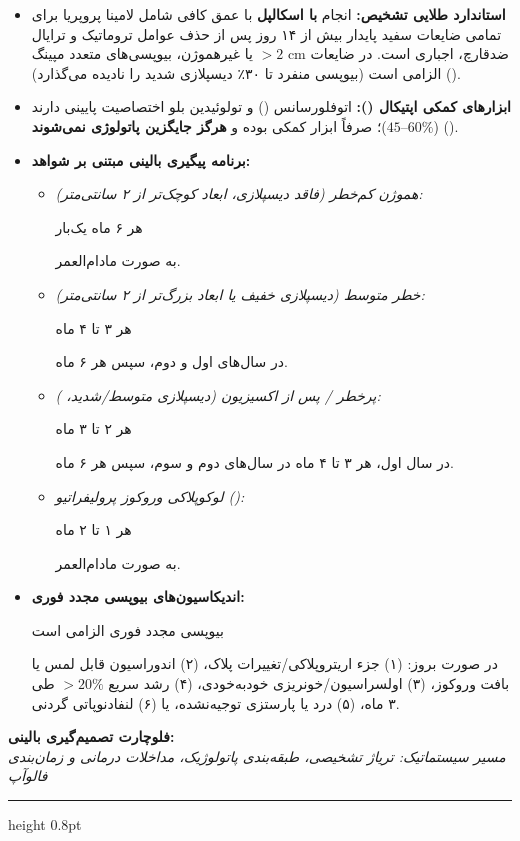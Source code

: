 \documentclass[a4paper]{article}
\newcommand{\hlg}[1]{\colorbox{hlgray}{\strut #1}}
\newcommand{\hly}[1]{\colorbox{hlyellow}{\strut #1}}
\newcommand{\hlr}[1]{\colorbox{hlred}{\strut\color{darkred}#1}}
\begin{document}
\begin{itemize}
    \item \textbf{استاندارد طلایی تشخیص:} انجام \textbf{ با اسکالپل} با عمق کافی شامل لامینا پروپریا برای تمامی ضایعات سفید پایدار بیش از ۱۴ روز پس از حذف عوامل تروماتیک و ترایال ضدقارچ، اجباری است. در ضایعات $>2\text{ cm}$ یا غیرهموژن، بیوپسی‌های متعدد مپینگ () الزامی است (بیوپسی منفرد تا ۳۰٪ دیسپلازی شدید را نادیده می‌گذارد).
    \item \textbf{ابزارهای کمکی اپتیکال ():} اتوفلورسانس () و تولوئیدین بلو اختصاصیت پایینی دارند ($45\text{--}60\%$)؛ صرفاً ابزار کمکی بوده و \textbf{هرگز جایگزین پاتولوژی نمی‌شوند} ().
    \item \textbf{برنامه پیگیری بالینی مبتنی بر شواهد:}
    \begin{itemize}
        \item \textit{هموژن کم‌خطر (فاقد دیسپلازی، ابعاد کوچک‌تر از ۲ سانتی‌متر):} \hlg{هر ۶ ماه یک‌بار} به صورت مادام‌العمر.
        \item \textit{خطر متوسط (دیسپلازی خفیف یا ابعاد بزرگ‌تر از ۲ سانتی‌متر):} \hlg{هر ۳ تا ۴ ماه} در سال‌های اول و دوم، سپس هر ۶ ماه.
        \item \textit{پرخطر / پس از اکسیزیون (دیسپلازی متوسط/شدید، ):} \hlg{هر ۲ تا ۳ ماه} در سال اول، هر ۳ تا ۴ ماه در سال‌های دوم و سوم، سپس هر ۶ ماه.
        \item \textit{لوکوپلاکی وروکوز پرولیفراتیو ():} \hlr{هر ۱ تا ۲ ماه} به صورت مادام‌العمر.
    \end{itemize}
    \item \textbf{اندیکاسیون‌های بیوپسی مجدد فوری:} \hly{بیوپسی مجدد فوری الزامی است} در صورت بروز: (۱) جزء اریتروپلاکی/تغییرات پلاک، (۲) اندوراسیون قابل لمس یا بافت وروکوز، (۳) اولسراسیون/خونریزی خودبه‌خودی، (۴) رشد سریع $>20\%$ طی ۳ ماه، (۵) درد یا پارستزی توجیه‌نشده، یا (۶) لنفادنوپاتی گردنی.
\end{itemize}

\clearpage

\begin{center}
{\Large\bfseries فلوچارت تصمیم‌گیری بالینی: }\\[2pt]
{\small\itshape مسیر سیستماتیک: تریاژ تشخیصی، طبقه‌بندی پاتولوژیک، مداخلات درمانی و زمان‌بندی فالوآپ}
\end{center}
\vspace{-4pt}
\hrule height 0.8pt
\vspace{8pt}
\end{document}
